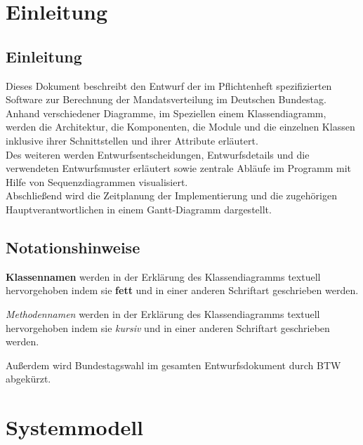 \documentclass[12pt,a4paper,titlepage]{article}
\newcommand{\myma}{\fontfamily{pcr}\selectfont \textbf}
\newcommand{\mymo}{\fontfamily{pcr}\selectfont \textit}
\begin{document}
\section{Einleitung}
\subsection{Einleitung}
Dieses Dokument beschreibt den Entwurf der im Pflichtenheft spezifizierten Software zur Berechnung der Mandatsverteilung im Deutschen Bundestag.\\
Anhand verschiedener Diagramme, im Speziellen einem Klassendiagramm, werden die Architektur, die Komponenten, die Module und die einzelnen Klassen inklusive ihrer Schnittstellen und ihrer Attribute erläutert.\\
Des weiteren werden Entwurfsentscheidungen, Entwurfsdetails und die verwendeten Entwurfsmuster erläutert sowie zentrale Abläufe im Programm mit Hilfe von Sequenzdiagrammen visualisiert.\\
Abschließend wird die Zeitplanung der Implementierung und die zugehörigen Hauptverantwortlichen in einem Gantt-Diagramm dargestellt.    
\subsection{Notationshinweise}
{\myma{Klassennamen}} werden in der Erklärung des Klassendiagramms textuell hervorgehoben indem sie \textbf{fett} und in einer anderen Schriftart geschrieben werden.\newline

{\mymo{Methodennamen}} werden in der Erklärung des Klassendiagramms textuell hervorgehoben indem sie \textit{kursiv} und in einer anderen Schriftart geschrieben werden.\newline

Außerdem wird Bundestagswahl im gesamten Entwurfsdokument durch BTW abgekürzt.

\newpage
\section{Systemmodell}
\end{document}
